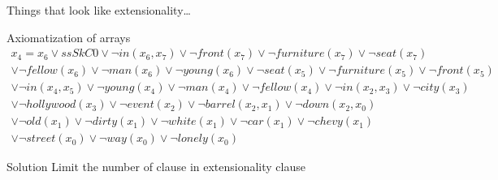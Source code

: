 \begin{frame}{Things that look like extensionality\dots}
  \begin{block}{Axiomatization of arrays}
    {\scriptsize
    \begin{gather*}
    x_4 = x_6 \lor ssSkC0 \lor \neg in(x_6 , x_7 ) \lor \neg front(x_7
    ) \lor \neg furniture(x_7 ) \lor \neg seat(x_7 ) \\ \lor \neg
    fellow (x_6 ) \lor \neg man(x_6 ) \lor \neg young(x_6 ) \lor \neg
    seat(x_5 ) \lor \neg furniture(x_5 ) \lor \neg front(x_5 ) \\ \lor
    \neg in(x_4 , x_5 ) \lor \neg young(x_4 ) \lor \neg man(x_4 ) \lor
    \neg fellow (x_4 ) \lor \neg in(x_2 , x_3 ) \lor \neg city(x_3 )
    \\ \lor \neg hollywood (x_3 ) \lor \neg event(x_2 ) \lor \neg
    barrel (x_2 , x_1 ) \lor \neg down(x_2 , x_0 ) \\ \lor \neg old
    (x_1 ) \lor \neg dirty(x_1 ) \lor \neg white(x_1 ) \lor \neg car
    (x_1 ) \lor \neg chevy(x_1 ) \\ \lor \neg street(x_0 ) \lor \neg
    way(x_0 ) \lor \neg lonely(x_0 )
    \end{gather*}
    }
  \end{block}

  \begin{block}{Solution}
    Limit the number of clause in extensionality clause
  \end{block}
\end{frame}
